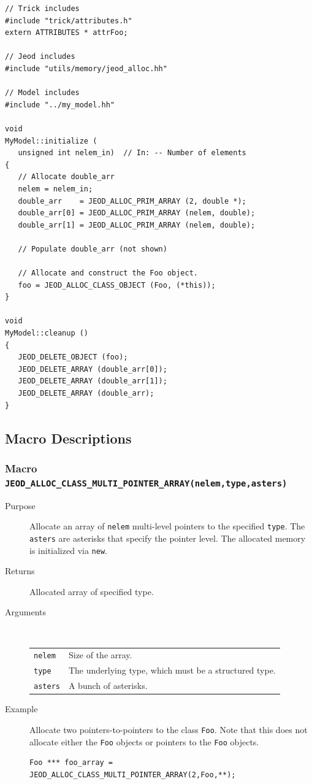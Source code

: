 \begin{verbatim}
// Trick includes
#include "trick/attributes.h"
extern ATTRIBUTES * attrFoo;

// Jeod includes
#include "utils/memory/jeod_alloc.hh"

// Model includes
#include "../my_model.hh"

void
MyModel::initialize (
   unsigned int nelem_in)  // In: -- Number of elements
{
   // Allocate double_arr
   nelem = nelem_in;
   double_arr    = JEOD_ALLOC_PRIM_ARRAY (2, double *);
   double_arr[0] = JEOD_ALLOC_PRIM_ARRAY (nelem, double);
   double_arr[1] = JEOD_ALLOC_PRIM_ARRAY (nelem, double);

   // Populate double_arr (not shown)

   // Allocate and construct the Foo object.
   foo = JEOD_ALLOC_CLASS_OBJECT (Foo, (*this));
}

void
MyModel::cleanup ()
{
   JEOD_DELETE_OBJECT (foo);
   JEOD_DELETE_ARRAY (double_arr[0]);
   JEOD_DELETE_ARRAY (double_arr[1]);
   JEOD_DELETE_ARRAY (double_arr);
}
\end{verbatim}

\subsection{Macro Descriptions}

\subsubsection{Macro {\tt JEOD\_ALLOC\_CLASS\_MULTI\_POINTER\_ARRAY(nelem,type,asters)}}
\begin{description}
\item[Purpose]
Allocate an array of {\tt nelem} multi-level pointers to the specified
{\tt type}. The {\tt asters} are asterisks that specify the pointer level.
The allocated memory is initialized via {\tt new}.
\item[Returns]
Allocated array of specified type.
\item[Arguments] \ \\
\begin{tabular}{@{}ll}
{\tt nelem} &  Size of the array. \\
{\tt type} &  The underlying type, which must be a structured type. \\
{\tt asters} &  A bunch of asterisks. \\
\end{tabular}
\item[Example]
Allocate two pointers-to-pointers to the class {\tt Foo}.
Note that this does not allocate either the {\tt Foo} objects or pointers to
the {\tt Foo} objects.
\begin{verbatim}
Foo *** foo_array = JEOD_ALLOC_CLASS_MULTI_POINTER_ARRAY(2,Foo,**);
\end{verbatim}
\end{description}

